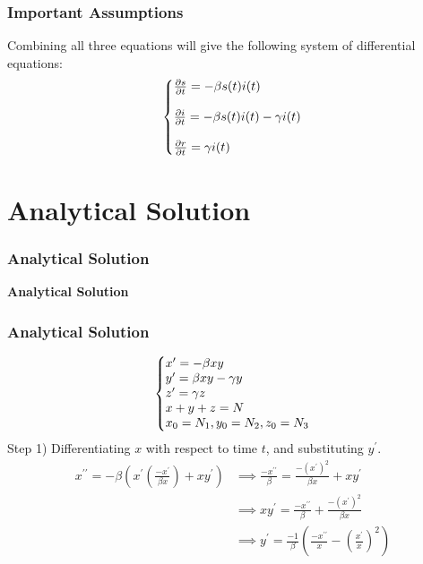 \documentclass{beamer}
\makeatletter
\newenvironment{system}%
{\left\lbrace\begin{array}{@{}l@{}}}%
{\end{array}\right.}
\makeatother
\begin{document}
\begin{frame}\frametitle{Important Assumptions}
Combining all three equations will give the following system of differential equations:
\begin{equation*}
    \begin{system}
        \frac{\partial{s}}{\partial{t}}=-\beta s(t)i(t)\\
        \\
        \frac{\partial{i}}{\partial{t}}=-\beta s(t)i(t)-\gamma i(t)\\
        \\
        \frac{\partial{r}}{\partial{t}}=\gamma i(t)
    \end{system}
\end{equation*}
\end{frame}


\section{Analytical Solution}
\begin{frame}\frametitle{Analytical Solution}
\begin{center}
    \textbf{Analytical Solution}
\end{center}
\end{frame}


\begin{frame}\frametitle{Analytical Solution}
\begin{equation*}
    \begin{system}
        x^{\prime} = -\beta x  y 
		\\
		y^{\prime} = \beta x  y - \gamma y 
		\\
		z^{\prime} = \gamma z 
		\\
		x + y + z = N
		\\
		x_0 = N_1, y_0 = N_2, z_0 = N_3
    \end{system}
\end{equation*}
Step 1) Differentiating $x$ with respect to time $t$, and substituting $y^{\prime}$.
\begin{equation*} 
	\begin{split}
		x^{\prime\prime} =
		-\beta\left( x^{\prime}\left(\frac{-x^{\prime}}{\beta x}\right) + x y^{\prime}\right)
		 & \implies \frac{-x^{\prime\prime}}{\beta} = \frac{-(x^{\prime})^{2}}{\beta x} + x y^{\prime}                             \\
		 & \implies x y^{\prime} = \frac{-x^{\prime\prime}}{\beta} + \frac{-(x^{\prime})^{2}}{\beta x}                             \\
		 & \implies y^{\prime} =  \frac{-1}{\beta}\left(\frac{-x^{\prime\prime}}{x} - \left(\frac{x^{\prime}}{x}\right)^{2}\right)
	\end{split}
\end{equation*}
\end{frame}
\end{document}
